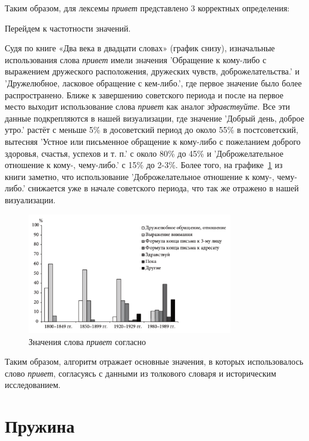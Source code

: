 Таким образом, для лексемы \textit{привет} представлено 3 корректных определения:

Перейдем к частотности значений.

Судя по книге «Два века в двадцати словах» (график снизу), изначальные использования слова \textit{привет}
имели значения ’Обращение к кому-либо с выражением дружеского расположения,
дружеских чувств, доброжелательства.’ и ’Дружелюбное, ласковое обращение с кем-либо.’,
где первое значение было более распространено.
Ближе к завершению советского периода и после на первое место выходит использование
слова \textit{привет} как аналог \textit{здравствуйте}.
Все эти данные подкрепляются в нашей визуализации, где значение ’Добрый день, доброе утро.’
растёт с меньше 5\% в досоветский период до около 55\% в постсоветский, вытесняя
’Устное или письменное обращение к кому-либо с пожеланием доброго здоровья, счастья, успехов и т. п.’
с около 80\% до 45\% и ’Доброжелательное отношение к кому-, чему-либо.’ с 15\% до 2-3\%.
Более того, на графике~\ref{fig:TwoCenturiesPrivet} из книги заметно, что использование ’Доброжелательное отношение к кому-, чему-либо.’
снижается уже в начале советского периода, что так же отражено в нашей визуализации.

\begin{figure}[H]
    \centering %
    \includegraphics[width=0.8\textwidth]{img/book/privet/all}
    \caption{Значения слова \textit{привет} согласно~\cite{TwoCenturies}}
    \label{fig:TwoCenturiesPrivet}
\end{figure}

Таким образом, алгоритм отражает основные значения, в которых использовалось
слово \textit{привет}, согласуясь с данными из толкового словаря и историческим исследованием.

\section*{Пружина}

